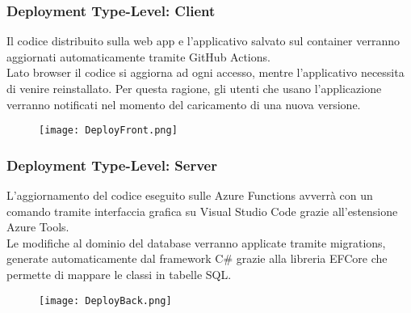 \subsubsection{Deployment Type-Level: Client}
Il codice distribuito sulla web app e l'applicativo salvato sul container verranno aggiornati automaticamente tramite GitHub Actions.\\
Lato browser il codice si aggiorna ad ogni accesso, mentre l'applicativo necessita di venire reinstallato. 
Per questa ragione, gli utenti che usano l'applicazione verranno notificati nel momento del caricamento di una nuova versione.\\

\begin{figure}[h!]
    \begin{center}
        \texttt{[image: DeployFront.png]}
    \end{center}
\end{figure}

\subsubsection{Deployment Type-Level: Server}
L'aggiornamento del codice eseguito sulle Azure Functions avverrà con un comando tramite interfaccia grafica su Visual Studio Code grazie all'estensione Azure Tools.\\
Le modifiche al dominio del database verranno applicate tramite migrations, generate automaticamente dal framework C\# grazie alla libreria EFCore che permette di mappare le classi in tabelle SQL.\\
\begin{figure}[h!]
    \begin{center}
        \texttt{[image: DeployBack.png]}
    \end{center}
\end{figure}
\clearpage